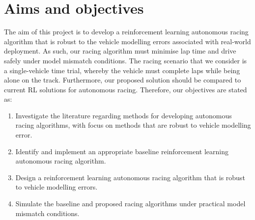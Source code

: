 \section{Aims and objectives}\label{sec:objectives}

The aim of this project is to develop a reinforcement learning autonomous racing algorithm that is robust to the vehicle modelling errors associated with real-world deployment.
As such, our racing algorithm must minimise lap time and drive safely under model mismatch conditions.
The racing scenario that we consider is a single-vehicle time trial, whereby the vehicle must complete laps while being alone on the track.
Furthermore, our proposed solution should be compared to current RL solutions for autonomous racing.
Therefore, our objectives are stated as:
\begin{enumerate}
    \item Investigate the literature regarding methods for developing autonomous racing algorithms, with focus on methods that are robust to vehicle modelling error.
    \item Identify and implement an appropriate baseline reinforcement learning autonomous racing algorithm.
    \item Design a reinforcement learning autonomous racing algorithm that is robust to vehicle modelling errors.
    \item Simulate the baseline and proposed racing algorithms under practical model mismatch conditions.
\end{enumerate}




